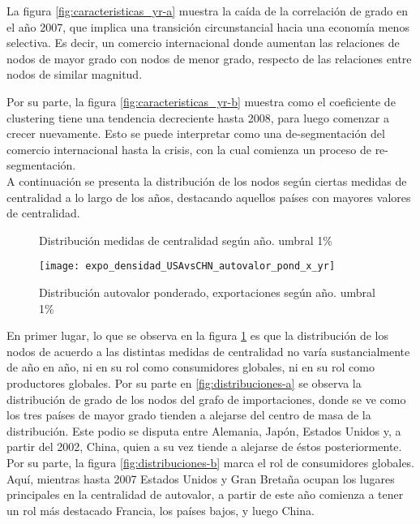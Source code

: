 \documentclass[class=article, crop=false]{standalone}
\begin{document}
La figura \ref{fig:caracteristicas_yr-a} muestra la caída de la correlación de grado en el año 2007, que implica una transición circunstancial hacia una economía menos selectiva. Es decir, un comercio internacional donde aumentan las relaciones de nodos de mayor grado con nodos de menor grado, respecto de las relaciones entre nodos de similar magnitud.

Por su parte, la figura \ref{fig:caracteristicas_yr-b} muestra como el coeficiente de clustering tiene una tendencia decreciente hasta 2008, para luego comenzar a crecer nuevamente. Esto se puede interpretar como una de-segmentación del comercio internacional hasta la crisis, con la cual comienza un proceso de re-segmentación. \\

A continuación se presenta la distribución de los nodos según ciertas medidas de centralidad a lo largo de los años, destacando aquellos países con mayores valores de centralidad. 


\begin{figure}
\centering
{}


%    
\caption{Distribución medidas de centralidad según año. umbral 1\%}
\label{fig:distribuciones}
\end{figure}



\begin{figure}
	\centering		\texttt{[image: expo\_densidad\_USAvsCHN\_autovalor\_pond\_x\_yr]}
	\caption{Distribución autovalor ponderado, exportaciones según año. umbral 1\%}
	\label{fig:distribuciones-c}
\end{figure}




En primer lugar, lo que se observa en la figura \ref{fig:distribuciones} es que la distribución de los nodos de acuerdo a las distintas medidas de centralidad no varía sustancialmente de año en año, ni en su rol como consumidores globales, ni en su rol como productores globales. Por su parte en \ref{fig:distribuciones-a} se observa la distribución de grado de los nodos del grafo de importaciones, donde se ve como los tres países de mayor grado tienden a alejarse del centro de masa de la distribución. Este podio se disputa entre Alemania, Japón, Estados Unidos y, a partir del 2002, China, quien a su vez tiende a alejarse de éstos posteriormente. Por su parte, la figura \ref{fig:distribuciones-b} marca el rol de consumidores globales. Aquí, mientras hasta 2007 Estados Unidos y Gran Bretaña ocupan los lugares principales en la centralidad de autovalor, a partir de este año comienza a tener un rol más destacado Francia, los países bajos, y luego China.      
\end{document}
